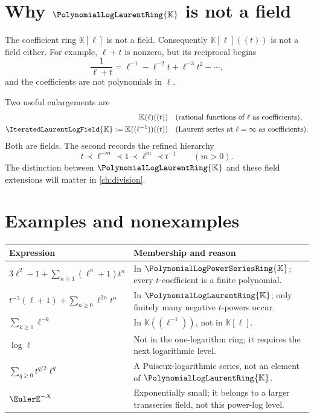 \documentclass[11pt,oneside,openany]{book}
\newcommand{\K}{\mathbb{K}}
\newcommand{\Rring}{\PolynomialLogPowerSeriesRing{\K}}
\newcommand{\Pring}{\PolynomialLogLaurentRing{\K}}
\newcommand{\Fring}{\IteratedLaurentLogField{\K}}
\begin{document}
\section{Why \texorpdfstring{\(\Pring\)}{P} is not a field}
The coefficient ring \(\K[\ell]\) is not a field.  Consequently
\(\K[\ell]((t))\) is not a field either.  For example, \(\ell+t\) is nonzero,
but its reciprocal begins
\begin{equation}\label{eq:elltrecip}
  \frac{1}{\ell+t}
  =\ell^{-1}-\ell^{-2}t+\ell^{-3}t^2-\cdots,
\end{equation}
and the coefficients are not polynomials in \(\ell\).

Two useful enlargements are
\begin{align}
  \K(\ell)((t))
  &\quad\text{(rational functions of \(\ell\) as coefficients)},
  \label{eq:rationalfield}\\
  \Fring:=\K((\ell^{-1}))((t))
  &\quad\text{(Laurent series at \(\ell=\infty\) as coefficients)}.
  \label{eq:iteratedfield}
\end{align}
Both are fields.  The second records the refined hierarchy
\[
  t\prec \ell^{-m}\prec1\prec\ell^m\prec t^{-1}
  \qquad(m>0).
\]
The distinction between \(\Pring\) and these field extensions will matter in
\cref{ch:division}.

\section{Examples and nonexamples}
\begin{center}
\begin{tabularx}{0.94\textwidth}{@{}>{\raggedright\arraybackslash}p{}X@{}}
\toprule
Expression & Membership and reason \\
\midrule
\(\displaystyle 3\ell^2-1+\sum_{n\geq1}(\ell^n+1)t^n\)
& In \(\Rring\); every \(t\)-coefficient is a finite polynomial. \\
\(\displaystyle t^{-3}(\ell+1)+\sum_{n\geq0}\ell^{2n}t^n\)
& In \(\Pring\); only finitely many negative \(t\)-powers occur. \\
\(\displaystyle \sum_{k\geq0}\ell^{-k}\)
& In \(\K((\ell^{-1}))\), not in \(\K[\ell]\). \\
\(\displaystyle \log\ell\)
& Not in the one-logarithm ring; it requires the next logarithmic level. \\
\(\displaystyle \sum_{q\geq0}t^{q/2}\ell^q\)
& A Puiseux-logarithmic series, not an element of \(\Pring\). \\
\(\displaystyle \EulerE^{-X}\)
& Exponentially small; it belongs to a larger transseries field, not this power-log level. \\
\bottomrule
\end{tabularx}
\end{center}
\end{document}
